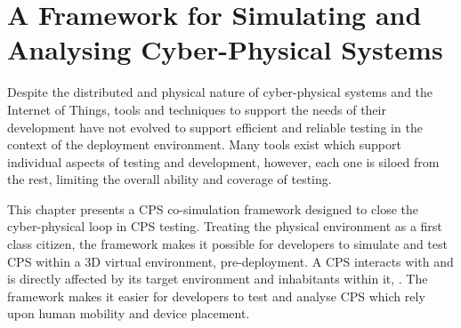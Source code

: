 \chapter{A Framework for Simulating and Analysing Cyber-Physical Systems}






Despite the distributed and physical nature of cyber-physical systems and the Internet of Things, tools and techniques to support the needs of their development have not evolved to support efficient and reliable testing in the context of the deployment environment. Many tools exist which support individual aspects of testing and development, however, each one is siloed from the rest, limiting the overall ability and coverage of testing.

This chapter presents a CPS co-simulation framework designed to close the cyber-physical loop in CPS testing. Treating the physical environment as a first class citizen, the framework makes it possible for developers to simulate and test CPS within a 3D virtual environment, pre-deployment. A CPS interacts with and is directly affected by its target environment and inhabitants within it, . The framework makes it easier for developers to test and analyse CPS which rely upon human mobility and device placement.

